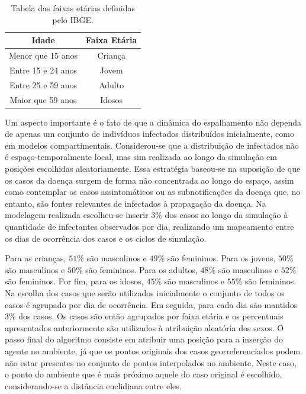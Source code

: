 \begin{table}[H]
\centering
\begin{tabular}{c|c}
 \textbf{Idade} 	& \textbf{Faixa Etária}	\\ \hline
 Menor que 15 anos 	& Criança		\\
 Entre 15 e 24 anos 	& Jovem			\\
 Entre 25 e 59 anos 	& Adulto		\\
 Maior que 59 anos 	& Idosos		\\
\end{tabular}
\caption{Tabela das faixas etárias definidas pelo IBGE.}
\label{tab:faixasEtariasIBGE}
\end{table}

Um aspecto importante é o fato de que a dinâmica do espalhamento não dependa de apenas um conjunto de indivíduos infectados distribuídos inicialmente, como em modelos compartimentais. Considerou-se que a distribuição de infectados não é espaço-temporalmente local, mas sim realizada ao longo da simulação em posições escolhidas aleatoriamente. Essa estratégia baseou-se na suposição de que os casos da doença surgem de forma não concentrada ao longo do espaço, assim como contemplar os casos assintomáticos ou as subnotificações da doença que, no entanto, são fontes relevantes de infectados à propagação da doença. Na modelagem realizada escolheu-se inserir 3\% dos casos ao longo da simulação à quantidade de infectantes observados por dia, realizando um mapeamento entre os dias de ocorrência dos casos e os ciclos de simulação.

Para as crianças, $51\%$ são masculinos e $49\%$ são femininos. Para os jovens, $50\%$ são masculinos e $50\%$ são femininos. Para os adultos, $48\%$ são masculinos e $52\%$ são femininos. Por fim, para os idosos, $45\%$ são masculinos e $55\%$ são femininos. Na escolha dos casos que serão utilizados inicialmente o conjunto de todos os casos é agrupado por dia de ocorrência. Em seguida, para cada dia são mantidos $3\%$ dos casos. Os casos são então agrupados por faixa etária e os percentuais apresentados anteriormente são utilizados à atribuição aleatória dos sexos. O passo final do algoritmo consiste em atribuir uma posição para a inserção do agente no ambiente, já que os pontos originais dos casos georreferenciados podem não estar presentes no conjunto de pontos interpolados no ambiente. Neste caso, o ponto do ambiente que é mais próximo aquele do caso original é escolhido, considerando-se a distância euclidiana entre eles. 

